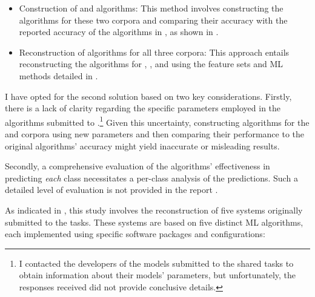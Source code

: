 \begin{itemize}
	\item Construction of \negcor and \wsj algorithms: This method involves constructing the algorithms for these two corpora and comparing their accuracy with the reported accuracy of the \msrcor algorithms in \citet{belz2010generating}, as shown in .
	
	\item Reconstruction of algorithms for all three corpora: This approach entails reconstructing the algorithms for \msrcor, \negcor, and \wsj using the feature sets and ML methods detailed in \citet{belz2010generating}.
	
\end{itemize}

I have opted for the second solution based on two key considerations. Firstly, there is a lack of clarity regarding the specific parameters employed in the algorithms submitted to \grec.\footnote{I contacted the developers of the models submitted to the \grec shared tasks to obtain information about their models' parameters, but unfortunately, the responses received did not provide conclusive details.} Given this uncertainty, constructing algorithms for the \wsj and \negcor corpora using new parameters and then comparing their performance to the original \msrcor algorithms' accuracy might yield inaccurate or misleading results. 

Secondly, a comprehensive evaluation of the algorithms' effectiveness in predicting \textit{each} class necessitates a per-class analysis of the predictions. Such a detailed level of evaluation is not provided in the \grec report \citep{belz2010generating}.

As indicated in , this study involves the reconstruction of five systems originally submitted to the \grec tasks. These systems are based on five distinct ML algorithms, each implemented using specific software packages and configurations:

